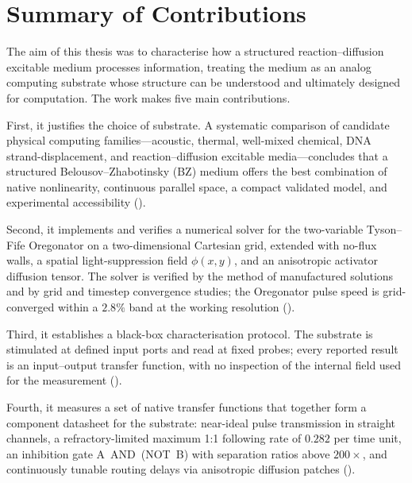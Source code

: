 
\section{Summary of Contributions}
\label{sec:conc_summary}

The aim of this thesis was to characterise how a structured reaction--diffusion excitable medium processes information, treating the medium as an analog computing substrate whose structure can be understood and ultimately designed for computation.
The work makes five main contributions.

First, it justifies the choice of substrate.
A systematic comparison of candidate physical computing families---acoustic, thermal, well-mixed chemical, DNA strand-displacement, and reaction--diffusion excitable media---concludes that a structured Belousov--Zhabotinsky (BZ) medium offers the best combination of native nonlinearity, continuous parallel space, a compact validated model, and experimental accessibility ().

Second, it implements and verifies a numerical solver for the two-variable Tyson--Fife Oregonator on a two-dimensional Cartesian grid, extended with no-flux walls, a spatial light-suppression field $\phi(x,y)$, and an anisotropic activator diffusion tensor.
The solver is verified by the method of manufactured solutions and by grid and timestep convergence studies; the Oregonator pulse speed is grid-converged within a $2.8\%$ band at the working resolution ().

Third, it establishes a black-box characterisation protocol.
The substrate is stimulated at defined input ports and read at fixed probes; every reported result is an input--output transfer function, with no inspection of the internal field used for the measurement ().

Fourth, it measures a set of native transfer functions that together form a component datasheet for the substrate: near-ideal pulse transmission in straight channels, a refractory-limited maximum 1:1 following rate of $0.282$ per time unit, an inhibition gate A~AND~(NOT~B) with separation ratios above $200\times$, and continuously tunable routing delays via anisotropic diffusion patches ().

